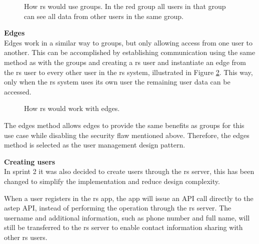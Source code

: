 \begin{figure}[h]
	\centering
	\label{fig:astepgroup}
	\caption{How \gls{rs} would use groups. In the red group all users in that group can see all data from other users in the same group.}
\end{figure}

\textbf{Edges}\\ 
Edges work in a similar way to groups, but only allowing access from one user to another.
This can be accomplished by establishing communication using the same method as with the groups and creating a \gls{rs} user and instantiate an edge from the \gls{rs} user to every other user in the \gls{rs} system, illustrated in Figure \ref{fig:astepedge}.
This way, only when the \gls{rs} system uses its own user the remaining user data can be accessed.

\begin{figure}[h]
	\centering
	\caption{How \gls{rs} would work with edges.}
	\label{fig:astepedge}
\end{figure}

The edges method allows edges to provide the same benefits as groups for this use case while disabling the security flaw mentioned above.
Therefore, the edges method is selected as the user management design pattern.

\textbf{Creating users}\\
In sprint 2 it was also decided to create users through the \gls{rs} server, this has been changed to simplify the implementation and reduce design complexity.

When a user registers in the \gls{rs} app, the app will issue an API call directly to the \gls{astep} API, instead of performing the operation through the \gls{rs} server. 
The username and additional information, such as phone number and full name, will still be transferred to the \gls{rs} server to enable contact information sharing with other \gls{rs} users.